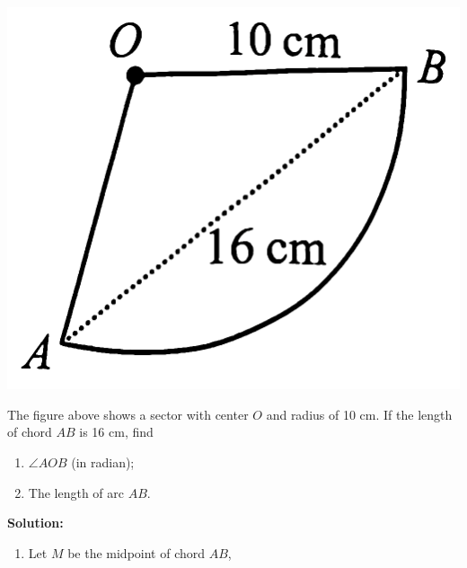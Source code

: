 \documentclass{report}
\newcommand{\sol}{\noindent\textbf{Solution:} }
\begin{document}
\begin{question}
    \begin{center}
        \includegraphics[scale=0.09]{assets/8-6.png}
    \end{center}
    \noindent The figure above shows a sector with center $O$ and radius of 10 cm. If the length of chord $AB$ is 16 cm, find
    \vspace{-1em}
    \begin{multicols}{2}
        \begin{enumerate}[label=(\alph*)]
            \item $\angle AOB$ (in radian);
            \item The length of arc $AB$.
        \end{enumerate}
    \end{multicols}
    \vspace{-1em}
    \sol{}
    \begin{enumerate}[label=(\alph*)]
        \item \begin{multicols}{2}
            Let $M$ be the midpoint of chord $AB$,
        

\end{multicols}
\end{enumerate}
\end{question}
\end{document}
